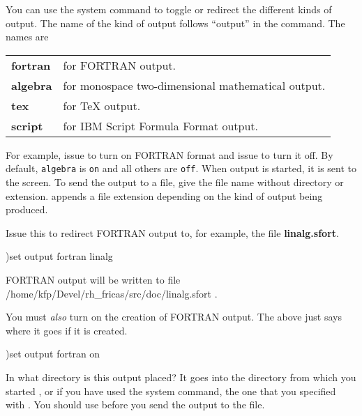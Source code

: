 You can use the 
system
command to
toggle or redirect the different kinds of output.
The name of the kind of output follows ``output'' in the command.
The names are

\begin{tabular}{@{}ll}
\bf fortran & for FORTRAN output. \\
\bf algebra & for monospace two-dimensional mathematical output. \\
\bf tex     & for \TeX{} output. \\
\bf script  & for IBM Script Formula Format output.
\end{tabular}

For example, issue  to turn on
FORTRAN format and
issue  to turn it off.
By default, {\tt algebra} is {\tt on} and all others are {\tt off}.
When output is started, it is sent to the screen.
To send the output to a file, give the file name without
directory or extension.
\Language{} appends a file extension depending on the kind of
output being produced.
\begin{xtc}
\begin{xtccomment}
Issue this to redirect FORTRAN output to, for example, the file
{\bf linalg.sfort}.
\end{xtccomment}
\begin{spadsrc}
)set output fortran linalg
\end{spadsrc}
\begin{SysCmdOutput}
   FORTRAN output will be written to file 
      /home/kfp/Devel/rh_fricas/src/doc/linalg.sfort .
\end{SysCmdOutput}
\end{xtc}
\begin{nullXtc}
\begin{xtccomment}
You must {\it also} turn on the creation of FORTRAN output.
The above just says where it goes if it is created.
\end{xtccomment}
\begin{spadsrc}
)set output fortran on
\end{spadsrc}
\end{nullXtc}
In what directory is this output placed?
It goes into the directory from which you started \Language{},
or if you have used the  system command, the one
that you specified with .
You should use  before you send the output to the file.

